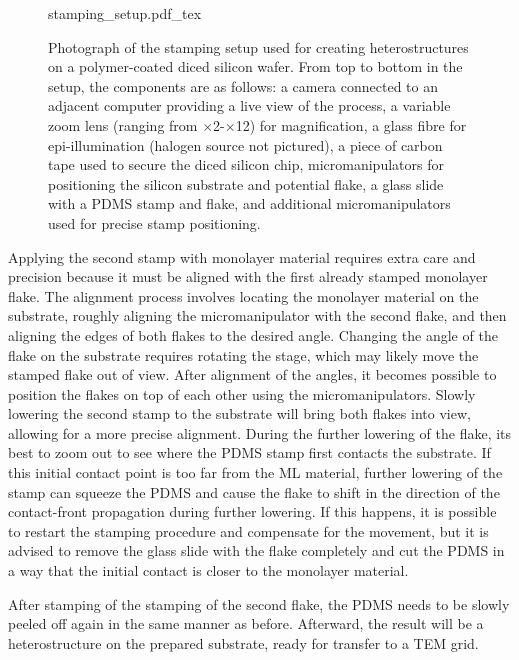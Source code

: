 \begin{figure}[hb]
	\centering
	\def\svgwidth{1\linewidth}
	{stamping_setup.pdf_tex}
    \caption{Photograph of the stamping setup used for creating heterostructures on a polymer-coated diced silicon wafer. 
    From top to bottom in the setup, the components are as follows: a camera connected to an adjacent computer providing a live view of the process, a variable zoom lens (ranging from $\times$2\--$\times$12) for magnification, a glass fibre for epi-illumination (halogen source not pictured), a piece of carbon tape used to secure the diced silicon chip, micromanipulators for positioning the silicon substrate and potential flake, a glass slide with a PDMS stamp and flake, and additional micromanipulators used for precise stamp positioning.}
	\label{fig:stamping_set-up}
\end{figure}

Applying the second stamp with monolayer material requires extra care and precision because  it must be aligned with the first already stamped monolayer flake. 
%
The alignment process involves locating the monolayer material on the substrate, roughly aligning the micromanipulator with the second flake, and then aligning the edges of both flakes to the desired angle.
%
Changing the angle of the flake on the substrate requires rotating the stage, which may likely move the stamped flake out of view. 
%
After alignment of the angles, it becomes possible to position the flakes on top of each other using the micromanipulators. 
%
Slowly lowering the second stamp to the substrate will bring both flakes into view, allowing for a more precise alignment.
%
During the further lowering of the flake, its best to zoom out to see where the PDMS stamp first contacts the substrate. 
%
If this initial contact point is too far from the ML material, further lowering of the stamp can squeeze the PDMS and cause the flake to shift in the direction of the contact-front propagation during further lowering.
%
If this happens, it is possible to restart the stamping procedure and compensate for the movement, but it is advised to remove the glass slide with the flake completely and cut the PDMS in a way that the initial contact is closer to the monolayer material.

After stamping of the stamping of the second flake, the PDMS needs to be slowly peeled off again in the same manner as before.
%
Afterward, the result will be a heterostructure on the prepared substrate, ready for transfer to a TEM grid.

